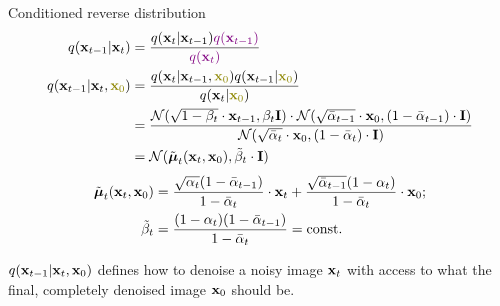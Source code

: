 \begin{frame}{Conditioned reverse distribution}
	\vspace{-0.3cm}
	\begin{align*}
		q(\bx_{t-1}|\bx_{t}) &= \frac{q(\bx_{t}|\bx_{t-1}) {\color{violet}q(\bx_{t-1})}}{{\color{violet}q(\bx_{t})}} \\
		q(\bx_{t-1}|\bx_{t}, {\color{olive}\bx_0}) & = \frac{q(\bx_{t}|\bx_{t-1}, {\color{olive}\bx_0}) q(\bx_{t-1} | {\color{olive}\bx_0}) }{q(\bx_{t}| {\color{olive}\bx_0})} \\
		& = \frac{\cN(\sqrt{1 - \beta_t} \cdot \bx_{t-1}, \beta_t \bI) \cdot \cN(\sqrt{\bar{\alpha}_{t-1}} \cdot \bx_0, (1 - \bar{\alpha}_{t-1}) \cdot \bI)}{ \cN(\sqrt{\bar{\alpha}_t} \cdot \bx_0, (1 - \bar{\alpha}_t) \cdot \bI)} \\
		&= \cN(\tilde{\bmu}_t(\bx_t, \bx_0), \tilde{\beta}_t \cdot \bI)
	\end{align*}
	\vspace{-0.7cm}
	\begin{align*}
		\tilde{\boldsymbol{\mu}}_t(\mathbf{x}_t, \mathbf{x}_0) &= \frac{\sqrt{\alpha_t}(1 - \bar{\alpha}_{t-1})}{1 - \bar{\alpha}_t} \cdot \mathbf{x}_t + \frac{\sqrt{\bar{\alpha}_{t-1}}(1 - \alpha_t)}{1 - \bar{\alpha}_t} \cdot \mathbf{x}_0; \\
		\tilde{\beta}_t &= \frac{(1 - \alpha_t)(1 - \bar{\alpha}_{t-1})}{1 - \bar{\alpha}_t} = \text{const}.
	\end{align*}
	\vspace{-0.5cm}
	
	$q(\mathbf{x}_{t-1} | \mathbf{x}_t, \mathbf{x}_0)$ defines how to denoise a noisy image $\mathbf{x}_t$ with access to what the final, completely denoised image $\mathbf{x}_0$ should be.
\end{frame}
